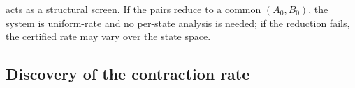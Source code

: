 \documentclass[lettersize,journal]{IEEEtran}
\newtheorem{remark}{Remark}
\begin{document}
 acts as a structural screen. If the pairs reduce to a common $(A_0,B_0)$, the system is uniform-rate and no per-state analysis is needed; if the reduction fails, the certified rate may vary over the state space.


\subsection{Discovery of the contraction rate}
\label{subsec:rate_discovery}
\end{document}
